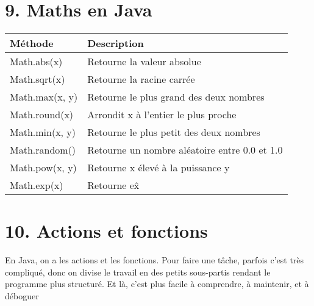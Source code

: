 \documentclass{article}
\begin{document}
\section*{9. Maths en Java}
\begin{tabular}{|l|l|}
\hline
\textbf{Méthode} & \textbf{Description} \\ 
\hline
Math.abs(x) & Retourne la valeur absolue \\ 
Math.sqrt(x) & Retourne la racine carrée \\ 
Math.max(x, y) & Retourne le plus grand des deux nombres \\ 
Math.round(x) & Arrondit x à l'entier le plus proche \\ 
Math.min(x, y) & Retourne le plus petit des deux nombres \\ 
Math.random() & Retourne un nombre aléatoire entre 0.0 et 1.0 \\ 
Math.pow(x, y) & Retourne x élevé à la puissance y \\ 
Math.exp(x) & Retourne e\^x \\ 
\hline
\end{tabular}

\section*{10. Actions et fonctions}
En Java, on a les actions et les fonctions. Pour faire une tâche, parfois c'est très compliqué, donc on divise le travail en des petits sous-partis rendant le programme plus structuré. Et là, c'est plus facile à comprendre, à maintenir, et à déboguer
\end{document}
